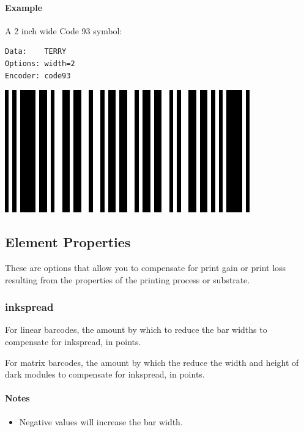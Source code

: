 \hypertarget{example-30}{%
\paragraph{Example}\label{example-30}}

A 2 inch wide Code 93 symbol:

\begin{verbatim}
Data:    TERRY
Options: width=2
Encoder: code93
\end{verbatim}

\includegraphics{images/optwidth.eps}

\hypertarget{element-properties}{%
\subsection{Element Properties}\label{element-properties}}

These are options that allow you to compensate for print gain or print
loss resulting from the properties of the printing process or substrate.

\hypertarget{inkspread}{%
\subsubsection{inkspread}\label{inkspread}}

For linear barcodes, the amount by which to reduce the bar widths to
compensate for inkspread, in points.

For matrix barcodes, the amount by which the reduce the width and height
of dark modules to compensate for inkspread, in points.

\hypertarget{notes-2}{%
\paragraph{Notes}\label{notes-2}}

\begin{itemize}
\tightlist
\item
  Negative values will increase the bar width.
\end{itemize}


